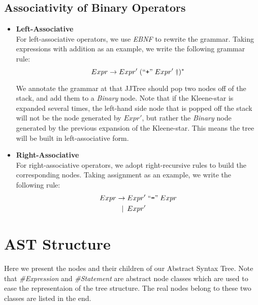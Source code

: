 \documentclass[a4paper,11pt]{article}
\begin{document}
\subsection{Associativity of Binary Operators}
\begin{itemize}
	\item \textbf{Left-Associative} \\
	For left-associative operators, we use \emph{EBNF} to rewrite the grammar.
	Taking expressions with addition as an example, we write the following grammar rule:
	\begin{equation*}
		Expr \rightarrow Expr' \;(\text{``\texttt{+}''}\; Expr' \;\dag)^*
	\end{equation*}

    We annotate the grammar at {\dag} that JJTree should pop two nodes off of the stack, and add them to a \emph{Binary} node.
    Note that if the Kleene-star is expanded several times, the left-hand side node that is popped off the stack will not be the node generated by $Expr'$, but rather the \emph{Binary} node generated by the previous expansion of the Kleene-star.
    This means the tree will be built in left-associative form.

	\item \textbf{Right-Associative} \\
	For right-associative operators, we adopt right-recursive rules to build the corresponding nodes.
	Taking assignment as an example, we write the following rule:
	\begin{align*}
		Expr \rightarrow &\; Expr' \;\text{``\texttt{=}''}\; Expr \\
             \mid \:     &\; Expr'
	\end{align*}
\end{itemize}


\newpage
\appendix
\renewcommand\thesection{Appendix \Alph{section}} %

\section{AST Structure}
Here we present the nodes and their children of our Abstract Syntax Tree. Note that \emph{\#Expression} and \emph{\#Statement} are abstract node classes which are used to ease the representaion of the tree structure. The real nodes belong to these two classes are listed in the end.

\hspace{1em}
\end{document}
